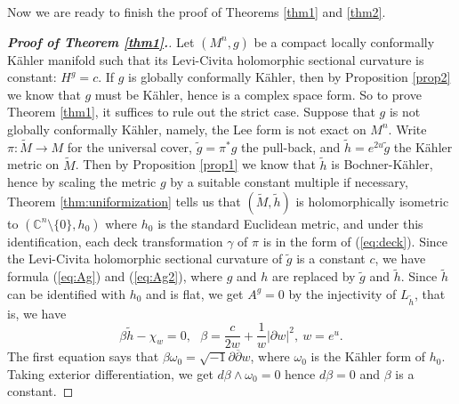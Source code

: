\documentclass{amsart}
\numberwithin{equation}{section}
\begin{document}
Now we are ready to finish the proof of Theorems \ref{thm1} and \ref{thm2}.

\vspace{0.05cm}

\begin{proof}[{\bf Proof of Theorem \ref{thm1}.}]
Let $(M^n,g)$ be a compact locally conformally K\"ahler manifold such that its Levi-Civita holomorphic sectional curvature is constant: $H^g=c$. If $g$ is globally conformally K\"ahler, then by Proposition \ref{prop2} we know that $g$ must be K\"ahler, hence is a complex space form. So to prove Theorem \ref{thm1}, it suffices to rule out the strict case. Suppose that $g$ is not globally conformally K\"ahler, namely, the Lee form is not exact on $M^n$. Write $\pi: \widetilde{M} \rightarrow M$ for the universal cover, $\widetilde{g}=\pi^{\ast}\!g$ the pull-back, and $\widetilde{h}=e^{2u}\widetilde{g}$ the K\"ahler metric on $\widetilde{M}$. Then by Proposition \ref{prop1} we know that $\widetilde{h}$ is Bochner-K\"ahler, hence by scaling the metric $g$ by a suitable constant multiple if necessary, Theorem \ref{thm:uniformization} tells us that $(\widetilde M, \widetilde h)$ is holomorphically isometric to $({\mathbb C}^n\setminus \{ 0\}, h_0)$ where $h_0$ is the standard Euclidean metric, and under this identification, each deck transformation $\gamma$ of $\pi$ is in the form of (\ref{eq:deck}). Since the Levi-Civita holomorphic sectional curvature of $\widetilde g$ is a constant $c$, we have formula (\ref{eq:Ag}) and (\ref{eq:Ag2}), where $g$ and $h$ are replaced by $\widetilde g$ and $\widetilde h$. Since $\widetilde h$ can be identified with $h_0$ and is flat, we get $A^g=0$ by the injectivity of $L_{\widetilde{h}}$, that is, we have
$$ \beta \widetilde h - \chi_w =0, \ \ \ \beta = \frac{c}{2w}+\frac{1}{w}|\partial w|^2,  \ w=e^u.$$
The first equation says that $\beta \omega_0 =\sqrt{-1}\partial \overline{\partial}w$, where $\omega_0$ is the K\"ahler form of $h_0$. Taking exterior differentiation, we get $d\beta \wedge \omega_0=0$ hence $d\beta =0$ and $\beta$ is a constant.


\end{proof}
\end{document}
